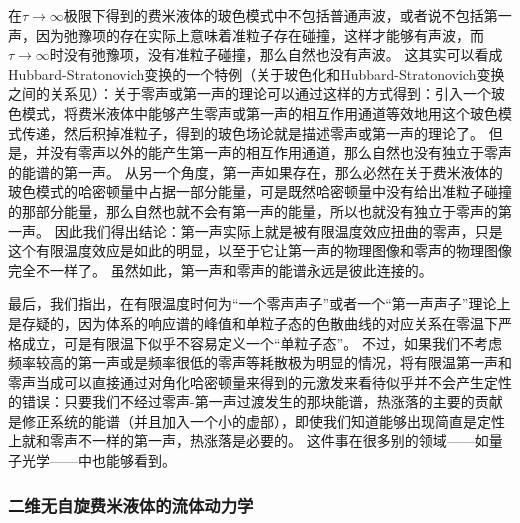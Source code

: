 在$\tau \to \infty$极限下得到的费米液体的玻色模式中不包括普通声波，或者说不包括第一声，因为弛豫项的存在实际上意味着准粒子存在碰撞，这样才能够有声波，而$\tau \to \infty$时没有弛豫项，没有准粒子碰撞，那么自然也没有声波。
这其实可以看成Hubbard-Stratonovich变换的一个特例（关于玻色化和Hubbard-Stratonovich变换之间的关系见\cite{hs-bosonization}）：关于零声或第一声的理论可以通过这样的方式得到：引入一个玻色模式，将费米液体中能够产生零声或第一声的相互作用通道等效地用这个玻色模式传递，然后积掉准粒子，得到的玻色场论就是描述零声或第一声的理论了。
但是，并没有零声以外的能产生第一声的相互作用通道，那么自然也没有独立于零声的能谱的第一声。
从另一个角度，第一声如果存在，那么必然在关于费米液体的玻色模式的哈密顿量中占据一部分能量，可是既然哈密顿量中没有给出准粒子碰撞的那部分能量，那么自然也就不会有第一声的能量，所以也就没有独立于零声的第一声。
因此我们得出结论：第一声实际上就是被有限温度效应扭曲的零声，只是这个有限温度效应是如此的明显，以至于它让第一声的物理图像和零声的物理图像完全不一样了。
虽然如此，第一声和零声的能谱永远是彼此连接的。

最后，我们指出，在有限温度时何为“一个零声声子”或者一个“第一声声子”理论上是存疑的，因为体系的响应谱的峰值和单粒子态的色散曲线的对应关系在零温下严格成立，可是有限温下似乎不容易定义一个“单粒子态”。
不过，如果我们不考虑频率较高的第一声或是频率很低的零声等耗散极为明显的情况，将有限温第一声和零声当成可以直接通过对角化哈密顿量来得到的元激发来看待似乎并不会产生定性的错误：只要我们不经过零声-第一声过渡发生的那块能谱，热涨落的主要的贡献是修正系统的能谱（并且加入一个小的虚部），即使我们知道能够出现简直是定性上就和零声不一样的第一声，热涨落是必要的。
这件事在很多别的领域——如量子光学——中也能够看到。

\subsubsection{二维无自旋费米液体的流体动力学}

